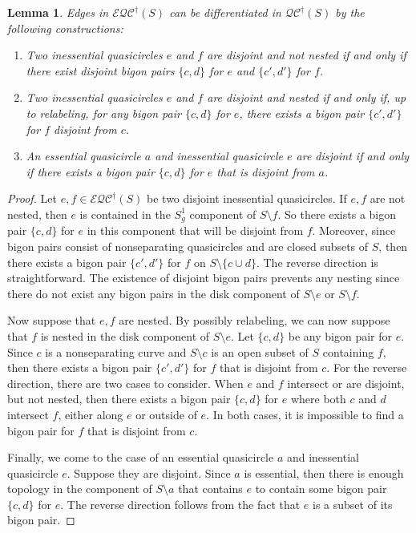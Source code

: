 \documentclass[12pt,a4paper]{amsart}
\theoremstyle{definition}
\theoremstyle{plain}
\newtheorem{lemma}[theorem]{Lemma}
\numberwithin{equation}{section}
\newcommand{\qcg}{\mathcal{QC}^{\dagger}}
\newcommand{\eqcg}{\mathcal{E\!QC}^{\dagger}}
\begin{document}
\begin{lemma}\label{Lem:EdgeBetweenExtendedGraph}
Edges in $\eqcg(S)$ can be differentiated in $\qcg(S)$ by the following constructions:
    \begin{enumerate}
        \item Two inessential quasicircles $e$ and $f$ are disjoint and not nested if and only if there exist disjoint bigon pairs $\{c, d\}$ for $e$ and $\{c',d'\}$ for $f$.
        \item Two inessential quasicircles $e$ and $f$ are disjoint and nested if and only if, up to relabeling, for any bigon pair $\{c, d\}$ for $e$, there exists a bigon pair $\{c',d'\}$ for $f$ disjoint from $c$.
        \item An essential quasicircle $a$ and inessential quasicircle $e$ are disjoint if and only if there exists a bigon pair $\{c, d\}$ for $e$ that is disjoint from $a$.
    \end{enumerate}
\end{lemma}

\begin{proof}
Let $e, f \in \eqcg(S)$ be two disjoint inessential quasicircles. If $e,f$ are not nested, then $e$ is contained in the $S^1_g$ component of $S\setminus f$. So there exists a bigon pair $\{c,d\}$ for $e$ in this component that will be disjoint from $f$. Moreover, since bigon pairs consist of nonseparating quasicircles and are closed subsets of $S$, then there exists a bigon pair $\{c',d'\}$ for $f$ on $S\setminus \{c\cup d\}$. The reverse direction is straightforward. The existence of disjoint bigon pairs prevents any nesting since there do not exist any bigon pairs in the disk component of $S \setminus e$ or $S \setminus f$. 

Now suppose that $e,f$ are nested. By possibly relabeling, we can now suppose that $f$ is nested in the disk component of $S \setminus e$. Let $\{c, d\}$ be any bigon pair for $e$. Since $c$ is a nonseparating curve and $S \setminus c$ is an open subset of $S$ containing $f$, then there exists a bigon pair $\{c',d'\}$ for $f$ that is disjoint from $c$. For the reverse direction, there are two cases to consider. When $e$ and $f$ intersect or are disjoint, but not nested, then there exists a bigon pair $\{c,d\}$ for $e$ where both $c$ and $d$ intersect $f$, either along $e$ or outside of $e$. In both cases, it is impossible to find a bigon pair for $f$ that is disjoint from $c$.

Finally, we come to the case of an essential quasicircle $a$ and inessential quasicircle $e$. Suppose they are disjoint. Since $a$ is essential, then there is enough topology in the component of $S\setminus a$ that contains $e$ to contain some bigon pair $\{c,d\}$ for $e$. The reverse direction follows from the fact that $e$ is a subset of its bigon pair.
\end{proof}
\end{document}
